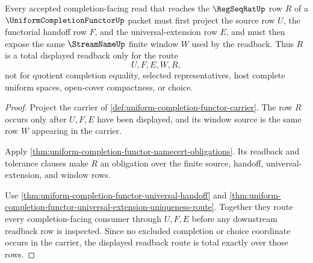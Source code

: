 \begin{theorem}
\label{thm:uniform-completion-functor-regseqrat-readback-totality}
Every accepted completion-facing read that reaches the $\RegSeqRatUp$ row $R$ of a $\UniformCompletionFunctorUp$ packet must first project the source row $U$, the functorial handoff row $F$, and the universal-extension row $E$, and must then expose the same $\StreamNameUp$ finite window $W$ used by the readback. Thus $R$ is a total displayed readback only for the route
$$
U,F,E,W,R,
$$
not for quotient completion equality, selected representatives, host complete uniform spaces, open-cover compactness, or choice.
\end{theorem}
\begin{proof}
Project the carrier of \autoref{def:uniform-completion-functor-carrier}. The row $R$ occurs only after $U,F,E$ have been displayed, and its window source is the same row $W$ appearing in the carrier.

Apply \autoref{thm:uniform-completion-functor-namecert-obligations}. Its readback and tolerance clauses make $R$ an obligation over the finite source, handoff, universal-extension, and window rows.

Use \autoref{thm:uniform-completion-functor-universal-handoff} and \autoref{thm:uniform-completion-functor-universal-extension-uniqueness-route}. Together they route every completion-facing consumer through $U,F,E$ before any downstream readback row is inspected. Since no excluded completion or choice coordinate occurs in the carrier, the displayed readback route is total exactly over those rows.
\end{proof}

